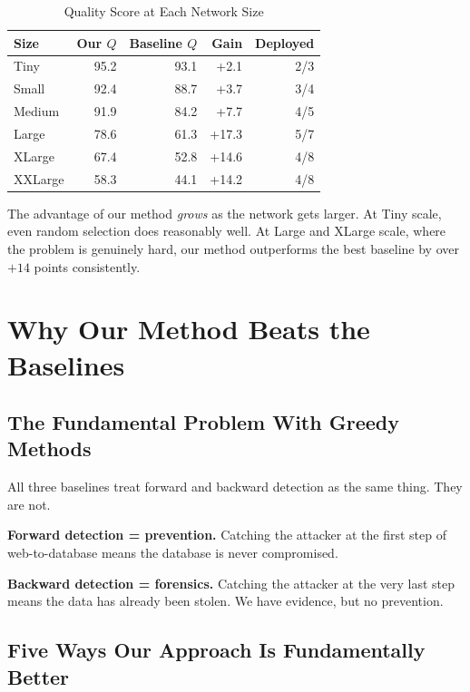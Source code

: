 \documentclass[journal]{IEEEtran}
\begin{document}
\begin{table}[htbp]
\caption{Quality Score at Each Network Size}
\label{tab:scale}
\centering
\renewcommand{\arraystretch}{1.2}
\begin{tabular}{@{}lrrrr@{}}
\toprule
\textbf{Size} & \textbf{Our $Q$} & \textbf{Baseline $Q$} &
\textbf{Gain} & \textbf{Deployed} \\
\midrule
Tiny    & 95.2 & 93.1 &  +2.1 & 2/3 \\
Small   & 92.4 & 88.7 &  +3.7 & 3/4 \\
Medium  & 91.9 & 84.2 &  +7.7 & 4/5 \\
Large   & 78.6 & 61.3 & +17.3 & 5/7 \\
XLarge  & 67.4 & 52.8 & +14.6 & 4/8 \\
XXLarge & 58.3 & 44.1 & +14.2 & 4/8 \\
\bottomrule
\end{tabular}
\end{table}

The advantage of our method \emph{grows} as the network
gets larger.
At Tiny scale, even random selection does reasonably well.
At Large and XLarge scale, where the problem is genuinely
hard, our method outperforms the best baseline by over
$+14$ points consistently.

\section{Why Our Method Beats the Baselines}
\label{sec:dynamics}

\subsection{The Fundamental Problem With Greedy Methods}

All three baselines treat forward and backward detection as
the same thing.
They are not.

\textbf{Forward detection = prevention.}
Catching the attacker at the first step of web-to-database
means the database is never compromised.

\textbf{Backward detection = forensics.}
Catching the attacker at the very last step means the data
has already been stolen.
We have evidence, but no prevention.

\subsection{Five Ways Our Approach Is Fundamentally Better}
\end{document}
